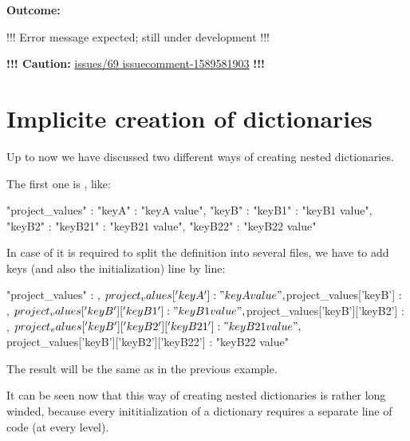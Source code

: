 \vspace{2ex}

\textbf{Outcome:}

\begin{pythonlog}
!!! Error message expected; still under development !!!
\end{pythonlog}

\textbf{!!! Caution:}
\href{https://github.com/test-fullautomation/python-jsonpreprocessor/issues/69#issuecomment-1589581903}{issues/69 issuecomment-1589581903} \textbf{!!!}



\newpage

\section{Implicite creation of dictionaries}

Up to now we have discussed two different ways of creating nested dictionaries.

The first one is , like:

\begin{pythoncode}
{
   "project_values" : {"keyA" : "keyA value",
                       "keyB" : {"keyB1" : "keyB1 value",
                                 "keyB2" : {"keyB21" : "keyB21 value",
                                            "keyB22" : "keyB22 value"}}}
}
\end{pythoncode}

In case of it is required to split the definition into several files, we have to add keys (and also the initialization) line by line:

\begin{pythoncode}
{
   "project_values" : {},
   ${project_values}['keyA'] : "keyA value",
   ${project_values}['keyB'] : {},
   ${project_values}['keyB']['keyB1'] : "keyB1 value",
   ${project_values}['keyB']['keyB2'] : {},
   ${project_values}['keyB']['keyB2']['keyB21'] : "keyB21 value",
   ${project_values}['keyB']['keyB2']['keyB22'] : "keyB22 value"
}
\end{pythoncode}

The result will be the same as in the previous example.

It can be seen now that this way of creating nested dictionaries is rather long winded, because every inititialization of a dictionary
requires a separate line of code (at every level).

